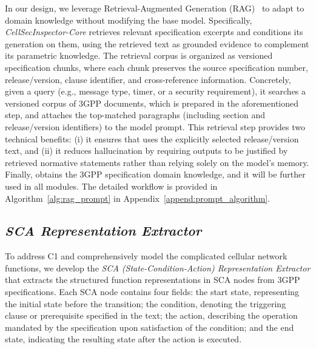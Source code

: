 In our design, we leverage Retrieval-Augmented Generation (RAG)~\cite{lewis2020retrieval} to adapt \core to domain knowledge without modifying the base model. Specifically, \textit{CellSec\-Inspector-Core} retrieves relevant specification excerpts and conditions its generation on them, using the retrieved text as grounded evidence to complement its parametric knowledge. 
The retrieval corpus is organized as versioned specification chunks, where each chunk preserves the source specification number, release/version, clause identifier, and cross-reference information.
Concretely, given a query (e.g., message type, timer, or a security requirement), it searches a versioned corpus of 3GPP documents, which is prepared in the aforementioned step, and attaches the top-matched paragraphs (including section and release/version identifiers) to the model prompt. This retrieval step provides two technical benefits: (i) it ensures that \core uses the explicitly selected release/version text, and (ii) it reduces hallucination by requiring outputs to be justified by retrieved normative statements rather than relying solely on the model’s memory. Finally, \core obtains the 3GPP specification domain knowledge, and it will be further used in all modules. The detailed workflow is provided in Algorithm~\ref{alg:rag_prompt} in Appendix~\ref{append:prompt_algorithm}.


\subsection{\textit{SCA Representation Extractor}}
\label{subsect:sca_representation}

To address C1 and comprehensively model the complicated cellular network functions, we develop the \textit{SCA (State-Condition-Action) Representation Extractor} that extracts the structured function representations in SCA nodes from 3GPP specifications. Each SCA node contains four fields: the start state, representing the initial state before the transition; the condition, denoting the triggering clause or prerequisite specified in the text; the action, describing the operation mandated by the specification upon satisfaction of the condition; and the end state, indicating the resulting state after the action is executed. 

